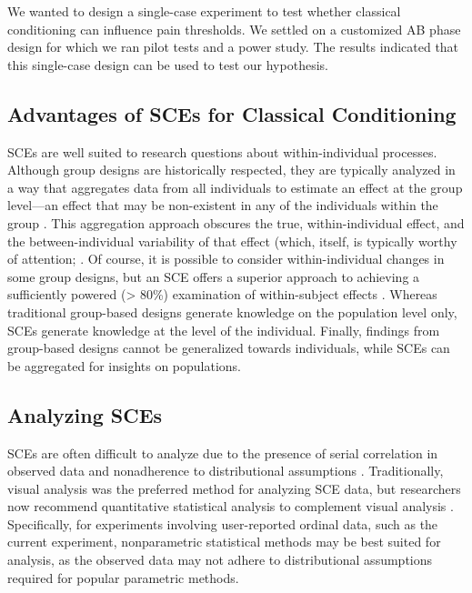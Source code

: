 \documentclass[empirical,issue, twocolumn,authordate]{jote-new-article}
\begin{document}
\begin{takeHomeMessage}
We wanted to design a single-case experiment to test whether classical conditioning can influence pain thresholds. We settled on a customized AB phase design for which we ran pilot tests and a power study. The results indicated that this single-case design can be used to test our hypothesis.
\end{takeHomeMessage}

\subsection{Advantages of SCEs for Classical Conditioning}

SCEs are well suited to research questions about within-individual processes. Although group designs are historically respected, they are typically analyzed in a way that aggregates data from all individuals to estimate an effect at the group level—an effect that may be non-existent in any of the individuals within the group \parencite{Molenaar2009}. This aggregation approach obscures the true, within-individual effect, and the between-individual variability of that effect (which, itself, is typically worthy of attention; \parencite{Fisher2018}. Of course, it is possible to consider within-individual changes in some group designs, but an SCE offers a superior approach to achieving a sufficiently powered (> 80\%) examination of within-subject effects \parencite{Ferron1995, Ferron1996}. Whereas traditional group-based designs generate knowledge on the population level only, SCEs generate knowledge at the level of the individual. Finally, findings from group-based designs cannot be generalized towards individuals, while SCEs can be aggregated for insights on populations.

\subsection{Analyzing SCEs}

SCEs are often difficult to analyze due to the presence of serial correlation in observed data and nonadherence to distributional assumptions \parencite{Busk1988, Solomon2014, Adams1996, Smith2012}. Traditionally, visual analysis was the preferred method for analyzing SCE data, but researchers now recommend quantitative statistical analysis to complement visual analysis \parencite{Ottenbacher1990, Matyas1990, Kratochwill2010a, Manolov2018, Manolov2017}. Specifically, for experiments involving user-reported ordinal data, such as the current experiment, nonparametric statistical methods may be best suited for analysis, as the observed data may not adhere to distributional assumptions required for popular parametric methods. 
\end{document}
